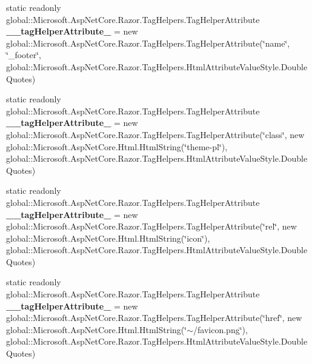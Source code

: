 \begin{DoxyCompactItemize}
\item 
\mbox{\label{class_asp_net_core_1_1_views___shared_____layout_a7c46f5c4cf52237fb2ccd5b51a4ed71c}} 
static readonly global\+::\+Microsoft.\+Asp\+Net\+Core.\+Razor.\+Tag\+Helpers.\+Tag\+Helper\+Attribute {\bfseries \+\_\+\+\_\+tag\+Helper\+Attribute\+\_} = new global\+::\+Microsoft.\+Asp\+Net\+Core.\+Razor.\+Tag\+Helpers.\+Tag\+Helper\+Attribute(\char`\"{}name\char`\"{}, \char`\"{}\+\_\+footer\char`\"{}, global\+::\+Microsoft.\+Asp\+Net\+Core.\+Razor.\+Tag\+Helpers.\+Html\+Attribute\+Value\+Style.\+Double\+Quotes)
\item 
\mbox{\label{class_asp_net_core_1_1_views___shared_____layout_a0cf9cef126072810ff58ad49f820f6e0}} 
static readonly global\+::\+Microsoft.\+Asp\+Net\+Core.\+Razor.\+Tag\+Helpers.\+Tag\+Helper\+Attribute {\bfseries \+\_\+\+\_\+tag\+Helper\+Attribute\+\_} = new global\+::\+Microsoft.\+Asp\+Net\+Core.\+Razor.\+Tag\+Helpers.\+Tag\+Helper\+Attribute(\char`\"{}class\char`\"{}, new global\+::\+Microsoft.\+Asp\+Net\+Core.\+Html.\+Html\+String(\char`\"{}theme-\/pl\char`\"{}), global\+::\+Microsoft.\+Asp\+Net\+Core.\+Razor.\+Tag\+Helpers.\+Html\+Attribute\+Value\+Style.\+Double\+Quotes)
\item 
\mbox{\label{class_asp_net_core_1_1_views___shared_____layout_ad9fb1eb391358f00c6066fe99aa8e183}} 
static readonly global\+::\+Microsoft.\+Asp\+Net\+Core.\+Razor.\+Tag\+Helpers.\+Tag\+Helper\+Attribute {\bfseries \+\_\+\+\_\+tag\+Helper\+Attribute\+\_} = new global\+::\+Microsoft.\+Asp\+Net\+Core.\+Razor.\+Tag\+Helpers.\+Tag\+Helper\+Attribute(\char`\"{}rel\char`\"{}, new global\+::\+Microsoft.\+Asp\+Net\+Core.\+Html.\+Html\+String(\char`\"{}icon\char`\"{}), global\+::\+Microsoft.\+Asp\+Net\+Core.\+Razor.\+Tag\+Helpers.\+Html\+Attribute\+Value\+Style.\+Double\+Quotes)
\item 
\mbox{\label{class_asp_net_core_1_1_views___shared_____layout_adfe36f2d312ceeb3bb7c29fe39e780a0}} 
static readonly global\+::\+Microsoft.\+Asp\+Net\+Core.\+Razor.\+Tag\+Helpers.\+Tag\+Helper\+Attribute {\bfseries \+\_\+\+\_\+tag\+Helper\+Attribute\+\_} = new global\+::\+Microsoft.\+Asp\+Net\+Core.\+Razor.\+Tag\+Helpers.\+Tag\+Helper\+Attribute(\char`\"{}href\char`\"{}, new global\+::\+Microsoft.\+Asp\+Net\+Core.\+Html.\+Html\+String(\char`\"{}$\sim$/favicon.\+png\char`\"{}), global\+::\+Microsoft.\+Asp\+Net\+Core.\+Razor.\+Tag\+Helpers.\+Html\+Attribute\+Value\+Style.\+Double\+Quotes)

\end{DoxyCompactItemize}
